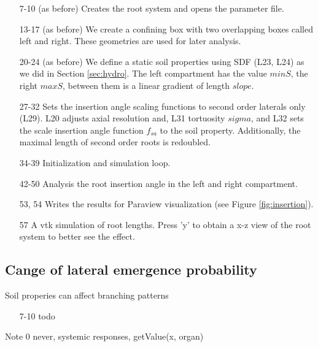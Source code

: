 \begin{itemize}

\item[7-10] (as before) Creates the root system and opens the parameter file.

\item[13-17](as before) We create a confining box with two overlapping boxes called left and right. These geometries are used for later analysis.

\item[20-24] (as before) We define a static soil properties using SDF (L23, L24) as we did in Section \ref{sec:hydro}. 
The left compartment has the value $minS$, the right $maxS$, between them is a linear gradient of length $slope$.

\item[27-32] Sets the insertion angle scaling functions to second order laterals only (L29). L20 adjusts axial resolution and, L31 tortuosity $sigma$, and L32 sets the scale insertion angle function $f_{sa}$ to the soil property. Additionally, the maximal length of second order roots is redoubled. 

\item[34-39] Initialization and simulation loop.

\item[42-50] Analysis the root insertion angle in the left and right compartment. 

\item[53, 54] Writes the results for Paraview visualization (see Figure \ref{fig:insertion}).

\item[57] A vtk simulation of root lengths. Press 'y' to obtain a x-z view of the root system to better see the effect. 

\end{itemize}




\subsection{Cange of lateral emergence probability} \label{sec:branching}

Soil properies can affect branching patterns




\begin{itemize}

\item[7-10] todo

\end{itemize}

Note 0 never, systemic responses, getValue(x, organ) 


